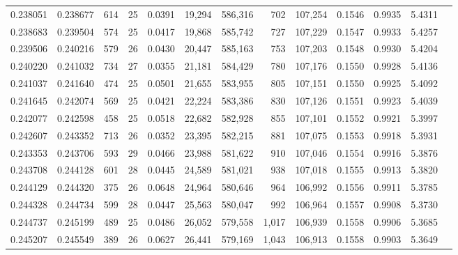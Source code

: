 \begin{tabular}{rrrrrrrrrrrrr}
0.238051 & 0.238677 &   614 &  25 &                                     0.0391 &  19,294 & 586,316 &     702 & 107,254 & 0.1546 & 0.9935 & 5.4311 \\
0.238683 & 0.239504 &   574 &  25 &                                     0.0417 &  19,868 & 585,742 &     727 & 107,229 & 0.1547 & 0.9933 & 5.4257 \\
0.239506 & 0.240216 &   579 &  26 &                                     0.0430 &  20,447 & 585,163 &     753 & 107,203 & 0.1548 & 0.9930 & 5.4204 \\
0.240220 & 0.241032 &   734 &  27 &                                     0.0355 &  21,181 & 584,429 &     780 & 107,176 & 0.1550 & 0.9928 & 5.4136 \\
0.241037 & 0.241640 &   474 &  25 &                                     0.0501 &  21,655 & 583,955 &     805 & 107,151 & 0.1550 & 0.9925 & 5.4092 \\
0.241645 & 0.242074 &   569 &  25 &                                     0.0421 &  22,224 & 583,386 &     830 & 107,126 & 0.1551 & 0.9923 & 5.4039 \\
0.242077 & 0.242598 &   458 &  25 &                                     0.0518 &  22,682 & 582,928 &     855 & 107,101 & 0.1552 & 0.9921 & 5.3997 \\
0.242607 & 0.243352 &   713 &  26 &                                     0.0352 &  23,395 & 582,215 &     881 & 107,075 & 0.1553 & 0.9918 & 5.3931 \\
0.243353 & 0.243706 &   593 &  29 &                                     0.0466 &  23,988 & 581,622 &     910 & 107,046 & 0.1554 & 0.9916 & 5.3876 \\
0.243708 & 0.244128 &   601 &  28 &                                     0.0445 &  24,589 & 581,021 &     938 & 107,018 & 0.1555 & 0.9913 & 5.3820 \\
0.244129 & 0.244320 &   375 &  26 &                                     0.0648 &  24,964 & 580,646 &     964 & 106,992 & 0.1556 & 0.9911 & 5.3785 \\
0.244328 & 0.244734 &   599 &  28 &                                     0.0447 &  25,563 & 580,047 &     992 & 106,964 & 0.1557 & 0.9908 & 5.3730 \\
0.244737 & 0.245199 &   489 &  25 &                                     0.0486 &  26,052 & 579,558 &   1,017 & 106,939 & 0.1558 & 0.9906 & 5.3685 \\
0.245207 & 0.245549 &   389 &  26 &                                     0.0627 &  26,441 & 579,169 &   1,043 & 106,913 & 0.1558 & 0.9903 & 5.3649 \\

\end{tabular}
